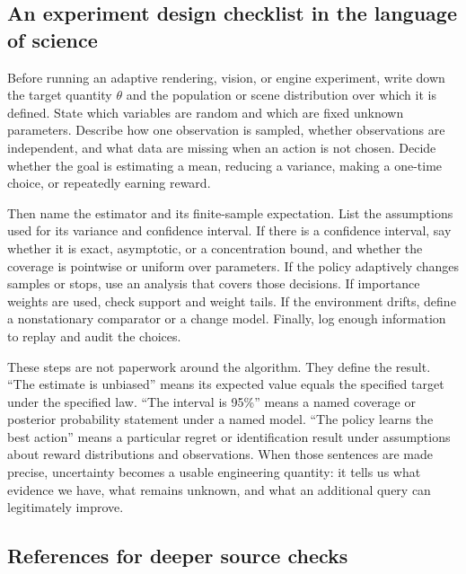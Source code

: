 \subsection{An experiment design checklist in the language of science}\label{02-foundations-ii-ch029-an-experiment-design-checklist-in-the-language-of-science}

Before running an adaptive rendering, vision, or engine experiment, write down the target quantity \(\theta\) and the population or scene distribution over which it is defined. State which variables are random and which are fixed unknown parameters. Describe how one observation is sampled, whether observations are independent, and what data are missing when an action is not chosen. Decide whether the goal is estimating a mean, reducing a variance, making a one-time choice, or repeatedly earning reward.

Then name the estimator and its finite-sample expectation. List the assumptions used for its variance and confidence interval. If there is a confidence interval, say whether it is exact, asymptotic, or a concentration bound, and whether the coverage is pointwise or uniform over parameters. If the policy adaptively changes samples or stops, use an analysis that covers those decisions. If importance weights are used, check support and weight tails. If the environment drifts, define a nonstationary comparator or a change model. Finally, log enough information to replay and audit the choices.

These steps are not paperwork around the algorithm. They define the result. ``The estimate is unbiased'' means its expected value equals the specified target under the specified law. ``The interval is 95\%'' means a named coverage or posterior probability statement under a named model. ``The policy learns the best action'' means a particular regret or identification result under assumptions about reward distributions and observations. When those sentences are made precise, uncertainty becomes a usable engineering quantity: it tells us what evidence we have, what remains unknown, and what an additional query can legitimately improve.

\subsection{References for deeper source checks}\label{02-foundations-ii-ch029-references-for-deeper-source-checks}

